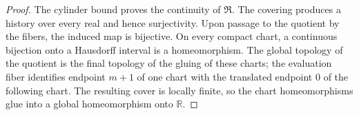 \begin{proof}
The cylinder bound proves the continuity of \(\mathfrak R\). The covering produces a history over every real and hence surjectivity. Upon passage to the quotient by the fibers, the induced map is bijective. On every compact chart, a continuous bijection onto a Hausdorff interval is a homeomorphism. The global topology of the quotient is the final topology of the gluing of these charts; the evaluation fiber identifies endpoint \(m+1\) of one chart with the translated endpoint \(0\) of the following chart. The resulting cover is locally finite, so the chart homeomorphisms glue into a global homeomorphism onto \(\mathbb R\).
\end{proof}
